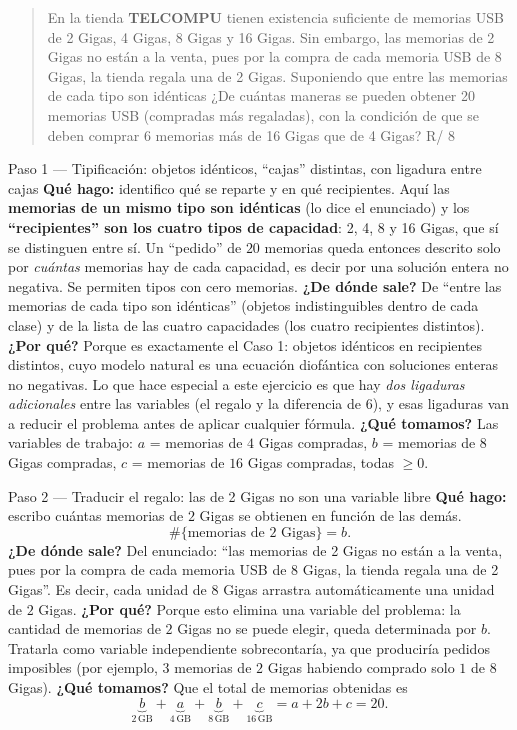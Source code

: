 \documentclass[11pt]{article}
\begin{document}
\begin{quote}
En la tienda \textbf{TELCOMPU} tienen existencia suficiente de memorias USB de 2 Gigas, 4 Gigas, 8 Gigas y 16 Gigas. Sin embargo, las memorias de 2 Gigas no están a la venta, pues por la compra de cada memoria USB de 8 Gigas, la tienda regala una de 2 Gigas. Suponiendo que entre las memorias de cada tipo son idénticas ¿De cuántas maneras se pueden obtener 20 memorias USB (compradas más regaladas), con la condición de que se deben comprar 6 memorias más de 16 Gigas que de 4 Gigas? \hfill R/ $8$
\end{quote}

\begin{paso}{Paso 1 --- Tipificación: objetos idénticos, ``cajas'' distintas, con ligadura entre cajas}
\textbf{Qué hago:} identifico qué se reparte y en qué recipientes.
Aquí las \textbf{memorias de un mismo tipo son idénticas} (lo dice el enunciado) y los \textbf{``recipientes'' son los cuatro tipos de capacidad}: 2, 4, 8 y 16 Gigas, que sí se distinguen entre sí. Un ``pedido'' de $20$ memorias queda entonces descrito solo por \emph{cuántas} memorias hay de cada capacidad, es decir por una solución entera no negativa. Se permiten tipos con cero memorias.
\textbf{¿De dónde sale?} De ``entre las memorias de cada tipo son idénticas'' (objetos indistinguibles dentro de cada clase) y de la lista de las cuatro capacidades (los cuatro recipientes distintos).
\textbf{¿Por qué?} Porque es exactamente el Caso 1: objetos idénticos en recipientes distintos, cuyo modelo natural es una ecuación diofántica con soluciones enteras no negativas. Lo que hace especial a este ejercicio es que hay \emph{dos ligaduras adicionales} entre las variables (el regalo y la diferencia de 6), y esas ligaduras van a reducir el problema antes de aplicar cualquier fórmula.
\textbf{¿Qué tomamos?} Las variables de trabajo: $a$ = memorias de $4$ Gigas compradas, $b$ = memorias de $8$ Gigas compradas, $c$ = memorias de $16$ Gigas compradas, todas $\ge 0$.
\end{paso}

\begin{paso}{Paso 2 --- Traducir el regalo: las de 2 Gigas no son una variable libre}
\textbf{Qué hago:} escribo cuántas memorias de $2$ Gigas se obtienen en función de las demás.
\[
\#\{\text{memorias de }2\text{ Gigas}\}=b .
\]
\textbf{¿De dónde sale?} Del enunciado: ``las memorias de 2 Gigas no están a la venta, pues por la compra de cada memoria USB de 8 Gigas, la tienda regala una de 2 Gigas''. Es decir, cada unidad de $8$ Gigas arrastra automáticamente una unidad de $2$ Gigas.
\textbf{¿Por qué?} Porque esto elimina una variable del problema: la cantidad de memorias de $2$ Gigas no se puede elegir, queda determinada por $b$. Tratarla como variable independiente sobrecontaría, ya que produciría pedidos imposibles (por ejemplo, $3$ memorias de $2$ Gigas habiendo comprado solo $1$ de $8$ Gigas).
\textbf{¿Qué tomamos?} Que el total de memorias obtenidas es
\[
\underbrace{b}_{2\,\text{GB}}+\underbrace{a}_{4\,\text{GB}}+\underbrace{b}_{8\,\text{GB}}+\underbrace{c}_{16\,\text{GB}}=a+2b+c=20 .
\]
\end{paso}
\end{document}
